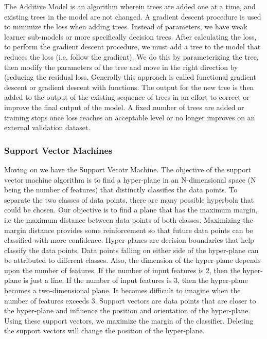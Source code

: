 \documentclass[12pt]{article}
\begin{document}
The Additive Model is an algorithm wherein trees are added one at a time, and existing trees in the model are not changed. A gradient descent procedure is used to minimize the loss when adding trees.  Instead of parameters, we have weak learner sub-models or more specifically decision trees. After calculating the loss, to perform the gradient descent procedure, we must add a tree to the model that reduces the loss (i.e. follow the gradient). We do this by parameterizing the tree, then modify the parameters of the tree and move in the right direction by (reducing the residual loss. Generally this approach is called functional gradient descent or gradient descent with functions. The output for the new tree is then added to the output of the existing sequence of trees in an effort to correct or improve the final output of the model. A fixed number of trees are added or training stops once loss reaches an acceptable level or no longer improves on an external validation dataset.


\subsubsection{Support Vector Machines}
Moving on we have the Support Vecotr Machine. The objective of the support vector machine algorithm is to find a hyper-plane in an N-dimensional space (N being the number of features) that distinctly classifies the data points. To separate the two classes of data points, there are many possible hyperbola that could be chosen. Our objective is to find a plane that has the maximum margin, i.e the maximum distance between data points of both classes. Maximizing the margin distance provides some reinforcement so that future data points can be classified with more confidence. Hyper-planes are decision boundaries that help classify the data points. Data points falling on either side of the hyper-plane can be attributed to different classes. Also, the dimension of the hyper-plane depends upon the number of features. If the number of input features is 2, then the hyper-plane is just a line. If the number of input features is 3, then the hyper-plane becomes a two-dimensional plane. It becomes difficult to imagine when the number of features exceeds 3. Support vectors are data points that are closer to the hyper-plane and influence the position and orientation of the hyper-plane. Using these support vectors, we maximize the margin of the classifier. Deleting the support vectors will change the position of the hyper-plane.
\end{document}
